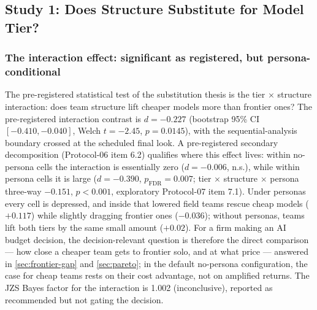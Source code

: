 \documentclass[12pt,a4paper]{article}
\begin{document}
\subsection{Study 1: Does Structure Substitute for Model Tier?}\label{sec:study1}

\subsubsection{The interaction effect: significant as registered, but
persona-conditional}\label{sec:interaction}

The pre-registered statistical test of the substitution thesis is the tier
$\times$ structure interaction: does team structure lift cheaper models more
than frontier ones? The pre-registered interaction contrast is $d = -0.227$
(bootstrap 95\% CI $[-0.410, -0.040]$, Welch $t = -2.45$, $p = 0.0145$), with
the sequential-analysis boundary crossed at the scheduled final look. A
pre-registered secondary decomposition (Protocol-06 item 6.2) qualifies where
this effect lives: within no-persona cells the interaction is essentially zero
($d = -0.006$, n.s.), while within persona cells it is large
($d = -0.390$, $p_{\mathrm{FDR}} = 0.007$; tier $\times$ structure $\times$
persona three-way $-0.151$, $p < 0.001$, exploratory Protocol-07 item 7.1).
Under personas every cell is depressed, and inside that lowered field teams
rescue cheap models ($+0.117$) while slightly dragging frontier ones
($-0.036$); without personas, teams lift both tiers by the same small amount
($+0.02$). For a
firm making an AI budget decision, the decision-relevant question is therefore
the direct comparison --- how close a cheaper team gets to frontier solo, and
at what price --- answered in \cref{sec:frontier-gap} and \cref{sec:pareto};
in the default no-persona configuration, the case for
cheap teams rests on their cost advantage, not on
amplified returns. The JZS Bayes factor for the interaction is
1.002 (inconclusive), reported as recommended but not gating the decision.
\end{document}
